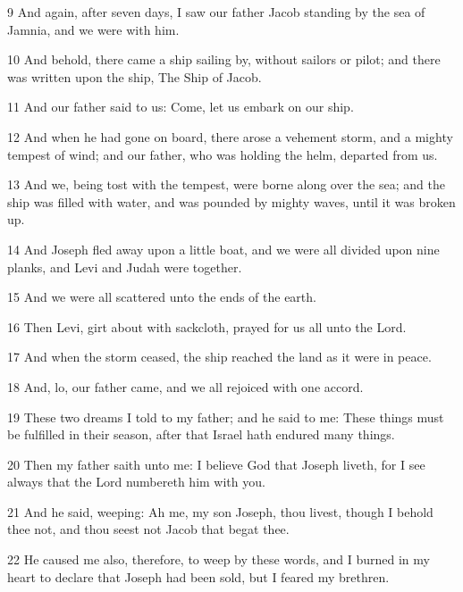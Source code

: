 \par 9 And again, after seven days, I saw our father Jacob standing by the sea of Jamnia, and we were with him.

\par 10 And behold, there came a ship sailing by, without sailors or pilot; and there was written upon the ship, The Ship of Jacob.

\par 11 And our father said to us: Come, let us embark on our ship.

\par 12 And when he had gone on board, there arose a vehement storm, and a mighty tempest of wind; and our father, who was holding the helm, departed from us.

\par 13 And we, being tost with the tempest, were borne along over the sea; and the ship was filled with water, and was pounded by mighty waves, until it was broken up.

\par 14 And Joseph fled away upon a little boat, and we were all divided upon nine planks, and Levi and Judah were together.

\par 15 And we were all scattered unto the ends of the earth.

\par 16 Then Levi, girt about with sackcloth, prayed for us all unto the Lord.

\par 17 And when the storm ceased, the ship reached the land as it were in peace.

\par 18 And, lo, our father came, and we all rejoiced with one accord.

\par 19 These two dreams I told to my father; and he said to me: These things must be fulfilled in their season, after that Israel hath endured many things.

\par 20 Then my father saith unto me: I believe God that Joseph liveth, for I see always that the Lord numbereth him with you.

\par 21 And he said, weeping: Ah me, my son Joseph, thou livest, though I behold thee not, and thou seest not Jacob that begat thee.

\par 22 He caused me also, therefore, to weep by these words, and I burned in my heart to declare that Joseph had been sold, but I feared my brethren.

